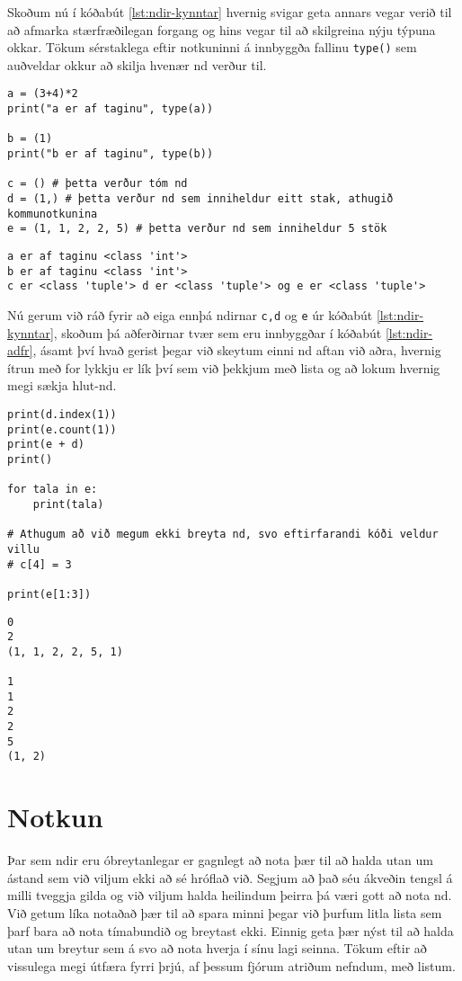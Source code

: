 Skoðum nú í kóðabút \ref{lst:ndir-kynntar} hvernig svigar geta annars vegar verið til að afmarka stærfræðilegan forgang og hins vegar til að skilgreina nýju týpuna okkar.
Tökum sérstaklega eftir notkuninni á innbyggða fallinu \texttt{type()} sem auðveldar okkur að skilja hvenær nd verður til.

\begin{lstlisting}[caption=Ndir skilgreindar, label=lst:ndir-kynntar]
a = (3+4)*2
print("a er af taginu", type(a))

b = (1)
print("b er af taginu", type(b))

c = () # þetta verður tóm nd
d = (1,) # þetta verður nd sem inniheldur eitt stak, athugið kommunotkunina
e = (1, 1, 2, 2, 5) # þetta verður nd sem inniheldur 5 stök
\end{lstlisting}
\lstset{style=uttak}
\begin{lstlisting}
a er af taginu <class 'int'>
b er af taginu <class 'int'>
c er <class 'tuple'> d er <class 'tuple'> og e er <class 'tuple'>
\end{lstlisting}
\lstset{style=venjulegt}

Nú gerum við ráð fyrir að eiga ennþá ndirnar \texttt{c,d} og \texttt{e} úr kóðabút \ref{lst:ndir-kynntar}, skoðum þá aðferðirnar tvær sem eru innbyggðar í kóðabút \ref{lst:ndir-adfr}, ásamt því hvað gerist þegar við skeytum einni nd aftan við aðra, hvernig ítrun með for lykkju er lík því sem við þekkjum með lista og að lokum hvernig megi sækja hlut-nd.

\begin{lstlisting}[caption=Ndir aðgerðir og aðferðir , label=lst:ndir-adfr]
print(d.index(1))
print(e.count(1)) 
print(e + d)
print()

for tala in e:
	print(tala)

# Athugum að við megum ekki breyta nd, svo eftirfarandi kóði veldur villu
# c[4] = 3

print(e[1:3])
\end{lstlisting}
\lstset{style=uttak}
\begin{lstlisting}
0
2
(1, 1, 2, 2, 5, 1)

1
1
2
2
5
(1, 2)
\end{lstlisting}
\lstset{style=venjulegt}



\section{Notkun}
Þar sem ndir eru óbreytanlegar er gagnlegt að nota þær til að halda utan um ástand sem við viljum ekki að sé hróflað við.
Segjum að það séu ákveðin tengsl á milli tveggja gilda og við viljum halda heilindum þeirra þá væri gott að nota nd.
Við getum líka notaðað þær til að spara minni þegar við þurfum litla lista sem þarf bara að nota tímabundið og breytast ekki.
Einnig geta þær nýst til að halda utan um breytur sem á svo að nota hverja í sínu lagi seinna.
Tökum eftir að vissulega megi útfæra fyrri þrjú, af þessum fjórum atriðum nefndum, með listum.

